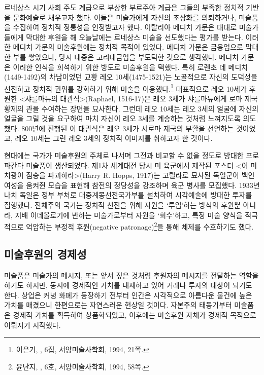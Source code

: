 르네상스 시기 사회 주도 계급으로 부상한 부르주아 계급은 그들의 부족한 정치적 기반을 문화예술로 채우고자 했다. 이들은 미술가에게 자신의 초상화를 의뢰하거나, 미술품을 수집하여 정치적 정통성을 인정받고자 했다. 이탈리아 메디치 가문은 대대로 미술가들에게 막대한 후원을 해 오늘날에는 르네상스 미술을 선도했다는 평가를 받는다. 이러한 메디치 가문의 미술후원에는 정치적 목적이 있었다. 메디치 가문은 금융업으로 막대한 부를 쌓았으나, 당시 대중은 고리대금업을 부도덕한 것으로 생각했다. 메디치 가문은 이러한 인식을 희석하기 위한 방도로 미술후원을 택했다. 특히 로렌초 데 메디치(1449-1492)의 차남이었던 교황 레오 10세(1475-1521)는 노골적으로 자신의 도덕성을 선전하고 정치적 권위를 강화하기 위해 미술을 이용했다.\footnote{이은기, ,  6집, 서양미술사학회, 1994, 21쪽.} 대표적으로 레오 10세가 후원한 <샤를마뉴의 대관식>(Raphael, 1516-17)은 레오 3세가 샤를마뉴에게 로마 제국 황제의 관을 수여하는 장면을 묘사한다. 그런데 레오 10세는 레오 3세의 얼굴에 자신의 얼굴을 그릴 것을 요구하여 마치 자신이 레오 3세를 계승하는 것처럼 느껴지도록 의도했다. 800년에 진행된 이 대관식은 레오 3세가 서로마 제국의 부활을 선언하는 것이었고, 레오 10세는 그런 레오 3세의 정치적 이미지를 취하고자 한 것이다.

현대에는 국가가 미술후원의 주체로 나서며 그전과 비교할 수 없을 정도로 방대한 프로파간다 미술품이 생산되었다. 제1차 세계대전 당시 미 육군에서 제작된 포스터 <이 미치광이 짐승을 파괴하라>(Harry R. Hopps, 1917)는 고릴라로 묘사된 독일군이 백인 여성을 움켜쥔 모습을 표현해 참전의 정당성을 강조하며 육군 병사를 모집했다. 1933년 나치 독일은 정부 부처로 대중계몽선전국가부를 설치하여 시각예술에 방대한 투자를 집행했다. 전체주의 국가는 정치적 선전을 위해 자원을 `투입'하는 방식의 후원뿐 아니라, 지배 이데올로기에 반하는 미술가로부터 자원을 `회수'하고, 특정 미술 양식을 적극적으로 억압하는 부정적 후원(negative patronage)\footnote{윤난지, ,  6호, 서양미술사학회, 1994, 58쪽.}을 통해 체제를 수호하기도 했다.

\subsection{미술후원의 경제성}

미술품은 미술가의 메시지, 또는 앞서 짚은 것처럼 후원자의 메시지를 전달하는 역할을 하기도 하지만, 동시에 경제적인 가치를 내재하고 있어 거래나 투자의 대상이 되기도 한다. 상업은 커녕 화폐가 등장하기 전부터 인간은 시각적으로 아름다운 물건에 높은 가치를 매겼으니 한편으로는 자연스러운 현상일 것이다. 자본주의 태동기부터 미술품은 경제적 가치를 획득하여 상품화되었고, 이후에는 미술후원 자체가 경제적 목적으로 이뤄지기 시작했다.

